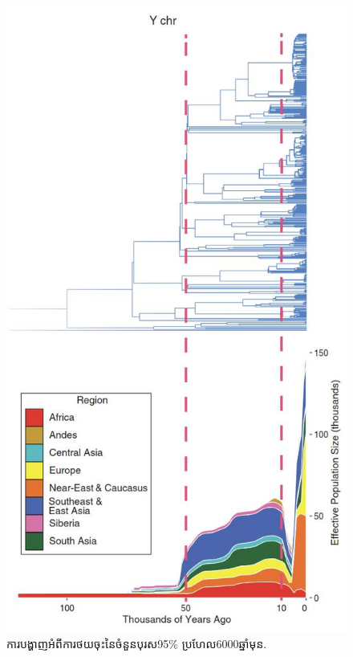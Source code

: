 \documentclass[10pt,twocolumn,letterpaper]{article}
\begin{document}
\begin{figure}[b]
\begin{center}
   \includegraphics[width=1\linewidth]{bottleneck.jpg}
\end{center}
   \caption{ការបង្ហាញអំពីការថយចុះនៃចំនួនបុរស95\% ប្រហែល6000ឆ្នាំមុន\cite{62}.}
\label{fig:10}
\label{fig:onecol}
\end{figure}
\end{document}
